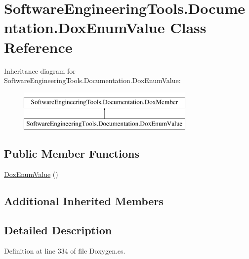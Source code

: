 \hypertarget{class_software_engineering_tools_1_1_documentation_1_1_dox_enum_value}{\section{Software\+Engineering\+Tools.\+Documentation.\+Dox\+Enum\+Value Class Reference}
\label{class_software_engineering_tools_1_1_documentation_1_1_dox_enum_value}
}
Inheritance diagram for Software\+Engineering\+Tools.\+Documentation.\+Dox\+Enum\+Value\+:\begin{figure}[H]
\begin{center}
\leavevmode
\includegraphics[height=2.000000cm]{class_software_engineering_tools_1_1_documentation_1_1_dox_enum_value}
\end{center}
\end{figure}
\subsection*{Public Member Functions}
\begin{DoxyCompactItemize}
\item 
\hyperlink{class_software_engineering_tools_1_1_documentation_1_1_dox_enum_value_ab4a2067bd0df322b2735ce84c032449a}{Dox\+Enum\+Value} ()
\end{DoxyCompactItemize}
\subsection*{Additional Inherited Members}


\subsection{Detailed Description}


Definition at line 334 of file Doxygen.\+cs.



